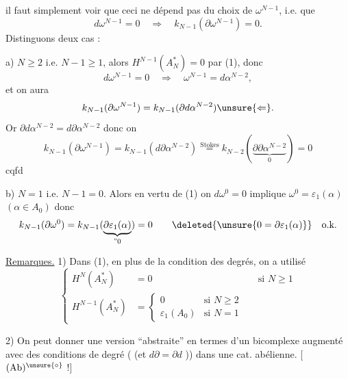 
il faut simplement voir que ceci ne dépend pas du choix de $\omega^{N-1}$, i.e. que 
\[
d\omega^{N-1}=0\quad\Longrightarrow\quad
k_{N-1}(\partial\omega^{N-1})=0.
\]
Distinguons deux cas :

a) $N\geq2$ i.e. $N-1\geq1$, alors $H^{N-1}(A_N^*)=0$ par (1), donc
\[
d\omega^{N-1}=0\quad\Rightarrow\quad
\omega^{N-1}=d\alpha^{N-2},
\]
et on aura
\[
k_{N-1}(\partial\omega^{N-1})
=k_{N-1}(\partial d\alpha^{N-2})\unsure{\Leftarrow}.
\]
Or  $\partial d\alpha^{N-2}=d\partial\alpha^{N-2}$ donc on 
\[
k_{N-1}(\partial\omega^{N-1})
=k_{N-1}(d\partial\alpha^{N-2})
\overset{\text{Stokes}}{=}
k_{N-2}(\underbrace{\partial\partial\alpha^{N-2}}_{0})=0
\]
cqfd

b) $N=1$ i.e. $N-1=0$. Alors en vertu de (1) on
$d\omega^0=0$ implique $\omega^0=\varepsilon_1(\alpha)$
$(\alpha\in A_0)$ donc
\[
k_{N-1}(\partial\omega^0)
=k_{N-1}(\underbrace{\partial\varepsilon_1(\alpha)}_{\text{''}0})=0
\qquad\deleted{\unsure{0=\partial\varepsilon_1(\alpha)}}\quad\text{o.k.}
\]

\uline{Remarques.} 1) Dans  (1), en plus de la condition des degrés, on a utilisé
\[
\left\{
\begin{aligned}
H^N(A_N^*)&=0 &&\text{si }N\geq1\\
H^{N-1}(A_N^*)&=
\begin{cases}
0&\text{si }N\geq2\\
\varepsilon_1(A_0)&\text{si }N=1
\end{cases}
\end{aligned}
\right.
\]

2) On peut donner une version ``abstraite'' en termes d'un bicomplexe augmenté avec des conditions de degré ( (et $d\partial=\partial d$ \unsure{!}))  dans une cat. abélienne. [ $(\mathrm{Ab})^{\unsure{\circ}}$ !]


